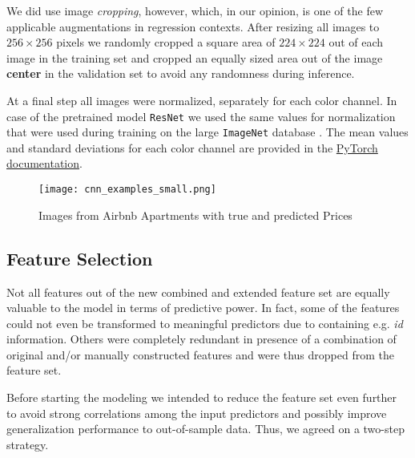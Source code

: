 We did use image \emph{cropping}, however, which, in our opinion, is one of the few applicable augmentations in regression contexts.
After resizing all images to $256 \times 256$ pixels we randomly cropped a square area of $224 \times 224$ out of each image in the training set and cropped an equally sized area out of the image \textbf{center} in the validation set to avoid any randomness during inference.

At a final step all images were normalized, separately for each color channel.
In case of the pretrained model \texttt{ResNet} we used the same values for normalization that were used during training on the large \texttt{ImageNet} database \citep{russakovsky2015}.
The mean values and standard deviations for each color channel are provided in the \href{https://pytorch.org/vision/stable/models.html}{PyTorch documentation}.

\begin{figure}[t]
  \centering
  \texttt{[image: cnn\_examples\_small.png]}
  \caption{Images from Airbnb Apartments with true and predicted Prices}
  \label{fig:cnn-examples}
\end{figure}

\subsection{Feature Selection} \label{appendix:feature-selection}

Not all features out of the new combined and extended feature set are equally valuable to the model in terms of predictive power.
In fact, some of the features could not even be transformed to meaningful predictors due to containing e.g. \emph{id} information.
Others were completely redundant in presence of a combination of original and/or manually constructed features and were thus dropped from the feature set.

Before starting the modeling we intended to reduce the feature set even further to avoid strong correlations among the input predictors and possibly improve generalization performance to out-of-sample data.
Thus, we agreed on a two-step strategy.

